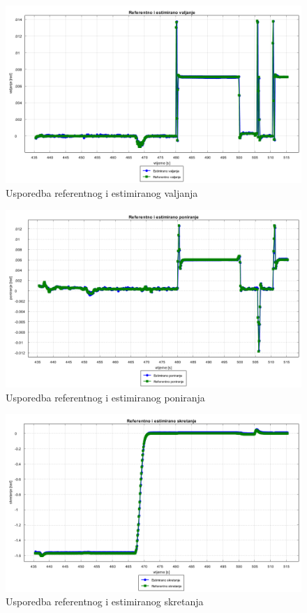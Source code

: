\begin{figure}[H]
  \includegraphics[scale=0.4]{images/voxel/pr4/referentno_estimirano_valjanje.png}
  \caption{Usporedba referentnog i estimiranog valjanja}
  \label{eval:a2p4_rot_roll}
\end{figure}
\begin{figure}[H]
  \includegraphics[scale=0.4]{images/voxel/pr4/referentno_estimirano_poniranje.png}
  \caption{Usporedba referentnog i estimiranog poniranja}
  \label{eval:a2p4_rot_pitch}
\end{figure}
\begin{figure}[H]
  \includegraphics[scale=0.4]{images/algo1/primjer4/referentno_estimirano_skretanje.png}
  \caption{Usporedba referentnog i estimiranog skretanja}
  \label{eval:a2p4_rot_yaw}
\end{figure}
\pagebreak